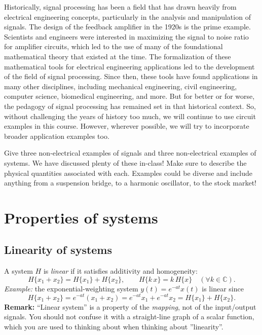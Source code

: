 Historically, signal processing has been a field that has drawn heavily from electrical engineering concepts, particularly in the analysis and manipulation of signals. The design of the feedback amplifier in the 1920s is the prime example. Scientists and engineers were interested in maximizing the signal to noise ratio for amplifier circuits, which led to the use of many of the foundational mathematical theory that existed at the time. The formalization of these mathematical tools for electrical engineering applications led to the development of the field of signal processing. Since then, these tools have found applications in many other disciplines, including mechanical engineering, civil engineering, computer science, biomedical engineering, and more. But for better or for worse, the pedagogy of signal processing has remained set in that historical context. So, without challenging the years of history too much, we will continue to use circuit examples in this course. However, wherever possible, we will try to incorporate broader application examples too. 
\begin{popquiz}
Give three non-electrical examples of signals and three non-electrical examples of systems. We have discussed plenty of these in-class! Make sure to describe the physical quantities associated with each.
\popqsplit
Examples could be diverse and include anything from a suspension bridge, to a harmonic oscillator, to the stock market!
\end{popquiz}

\section{Properties of systems}

\subsection{Linearity of systems}
A system $H$ is \emph{linear} if it satisfies additivity and homogeneity:
\[
H\{x_1+x_2\}=H\{x_1\}+H\{x_2\},\qquad H\{k\,x\}=k\,H\{x\}\quad(\forall k\in\mathbb{C}).
\]
\textit{Example:} the exponential-weighting system $y(t)=e^{-a t}x(t)$ is linear since
\[
H\{x_1+x_2\}=e^{-a t}(x_1+x_2)=e^{-a t}x_1+e^{-a t}x_2=H\{x_1\}+H\{x_2\}.
\]
\textbf{Remark:} ``Linear system'' is a property of the \emph{mapping}, not of the input/output signals. You should not confuse it with a straight-line graph of a scalar function, which you are used to thinking about when thinking about ''linearity''.

